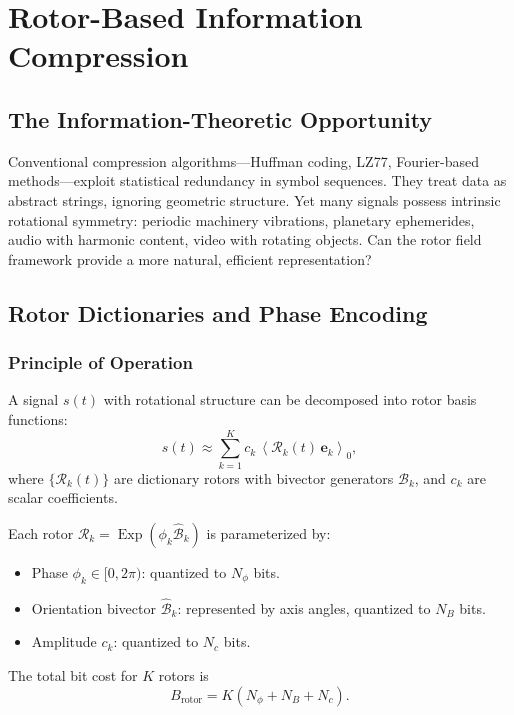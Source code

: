 \documentclass[11pt,a4paper]{article}
\newcommand{\grade}[2]{\left\langle #1 \right\rangle_{#2}}
\newcommand{\scal}[1]{\grade{#1}{0}}
\newcommand{\Exp}{\operatorname{Exp}}
\newcommand{\Rotor}{\mathcal{R}}
\newcommand{\Biv}{\mathcal{B}}
\theoremstyle{definition}
\theoremstyle{plain}
\theoremstyle{remark}
\begin{document}
\vspace{1em}

\section{Rotor-Based Information Compression}\label{sec:compression}

\subsection{The Information-Theoretic Opportunity}

Conventional compression algorithms---Huffman coding, LZ77, Fourier-based methods---exploit statistical redundancy in symbol sequences. They treat data as abstract strings, ignoring geometric structure. Yet many signals possess intrinsic rotational symmetry: periodic machinery vibrations, planetary ephemerides, audio with harmonic content, video with rotating objects. Can the rotor field framework provide a more natural, efficient representation?

\subsection{Rotor Dictionaries and Phase Encoding}

\subsubsection{Principle of Operation}

A signal $s(t)$ with rotational structure can be decomposed into rotor basis functions:
\begin{equation}
s(t) \approx \sum_{k=1}^K c_k \,\scal{\Rotor_k(t)\, \mathbf{e}_k},
\end{equation}
where $\{\Rotor_k(t)\}$ are dictionary rotors with bivector generators $\Biv_k$, and $c_k$ are scalar coefficients.

Each rotor $\Rotor_k = \Exp(\phi_k \hat{\Biv}_k)$ is parameterized by:
\begin{itemize}
  \item Phase $\phi_k \in [0, 2\pi)$: quantized to $N_\phi$ bits.
  \item Orientation bivector $\hat{\Biv}_k$: represented by axis angles, quantized to $N_B$ bits.
  \item Amplitude $c_k$: quantized to $N_c$ bits.
\end{itemize}

The total bit cost for $K$ rotors is
\begin{equation}
B_{\text{rotor}} = K(N_\phi + N_B + N_c).
\end{equation}
\end{document}
